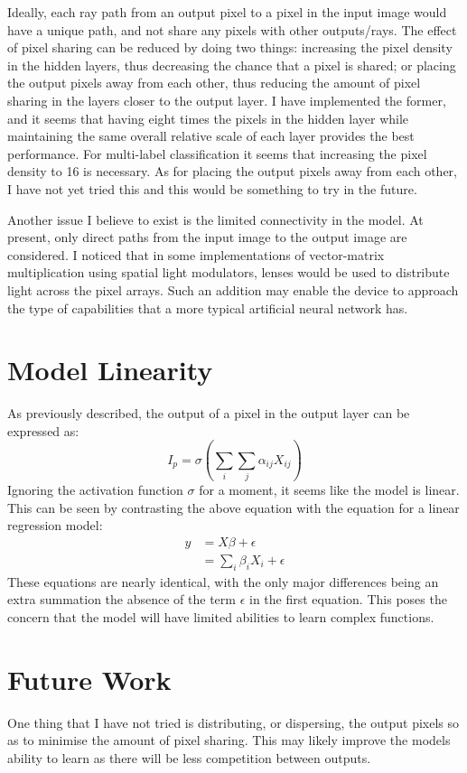 \documentclass[]{article}
\begin{document}
Ideally, each ray path from an output pixel to a pixel in the input image would have a unique path, and not share any pixels with other outputs/rays. The effect of pixel sharing can be reduced by doing two things: increasing the pixel density in the hidden layers, thus decreasing the chance that a pixel is shared; or placing the output pixels away from each other, thus reducing the amount of pixel sharing in the layers closer to the output layer. I have implemented the former, and it seems that having eight times the pixels in the hidden layer while maintaining the same overall relative scale of each layer provides the best performance. For multi-label classification it seems that increasing the pixel density to 16 is necessary. As for placing the output pixels away from each other, I have not yet tried this and this would be something to try in the future.

Another issue I believe to exist is the limited connectivity in the model. At present, only direct paths from the input image to the output image are considered. I noticed that in some implementations of vector-matrix multiplication using spatial light modulators, lenses would be used to distribute light across the pixel arrays. Such an addition may enable the device to approach the type of capabilities that a more typical artificial neural network has.

\section{Model Linearity}
As previously described, the output of a pixel in the output layer can be expressed as:
$$I_p=\sigma(\sum_{i}\sum_{j}\alpha_{ij}X_{ij})$$
Ignoring the activation function $\sigma$ for a moment, it seems like the model is linear. This can be seen by contrasting the above equation with the equation for a linear regression model:
\begin{equation*}
\begin{aligned}
y &= X\beta + \epsilon \\
  &= \sum_{i}\beta_i X_i + \epsilon
\end{aligned}
\end{equation*}
These equations are nearly identical, with the only major differences being an extra summation the absence of the term $\epsilon$ in the first equation. This poses the concern that the model will have limited abilities to learn complex functions.

\section{Future Work}
One thing that I have not tried is distributing, or dispersing, the output pixels so as to minimise the amount of pixel sharing. This may likely improve the models ability to learn as there will be less competition between outputs.
\end{document}
